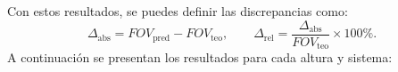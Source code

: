 
     
 
     Con estos resultados, se puedes definir las discrepancias como:
     \[
       \Delta_{\mathrm{abs}} = FOV_{\mathrm{pred}} - FOV_{\mathrm{teo}},
       \qquad
       \Delta_{\mathrm{rel}} = \frac{\Delta_{\mathrm{abs}}}{FOV_{\mathrm{teo}}}\times100\%.
     \]
     A continuación se presentan los resultados para cada altura y sistema:
     

